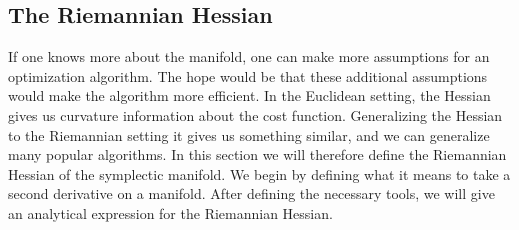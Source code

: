 \subsection{The Riemannian Hessian}
If one knows more about the manifold, one can make more assumptions for an optimization algorithm. The hope would be that these additional assumptions would make the algorithm more efficient. In the Euclidean setting, the Hessian gives us curvature information about the cost function. Generalizing the Hessian to the Riemannian setting it gives us something similar, and we can generalize many popular algorithms. In this section we will therefore define the Riemannian Hessian of the symplectic manifold. We begin by defining what it means to take a second derivative on a manifold. After defining the necessary tools, we will give an analytical expression for the Riemannian Hessian. 

